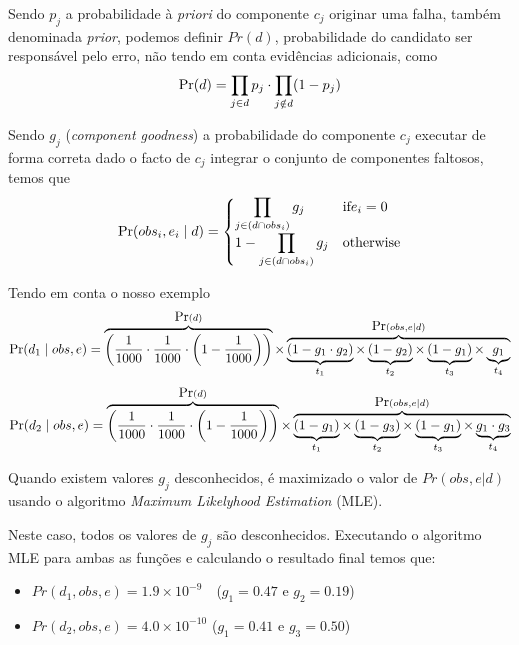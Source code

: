 Sendo $p_j$ a probabilidade à \emph{priori} do componente $c_j$ originar uma falha, também denominada \emph{prior}, podemos definir $Pr(d)$, probabilidade do candidato ser responsável pelo erro, não tendo em conta evidências adicionais, como
%
\begin{equation}
  \mbox{Pr}(d) = \prod_{j \in d} p_j \cdot \prod_{j \notin d} (1 - p_j)
\end{equation}


Sendo $g_j$ (\emph{component goodness}) a probabilidade do componente $c_j$ executar de forma correta dado o facto de $c_j$ integrar o conjunto de componentes faltosos, temos que
% 
\begin{equation}
  \mbox{Pr}(obs_i, e_i \mid  d) = 
  \begin{cases}
    \displaystyle\prod_{j \in (d \cap obs_i)} g_j 		& \textrm{if} e_i = 0 \\
	1 - \displaystyle\prod_{j \in (d \cap obs_i)} g_j  & \textrm{otherwise}
  \end{cases}
\end{equation}

Tendo em conta o nosso exemplo
%
\begin{equation}
    \mbox{Pr}(d_1 \mid obs,e) =
    \overbrace{\bigg(\frac{1}{1000} \cdot \frac{1}{1000} \cdot \bigg(1 - \frac{1}{1000}\bigg)\bigg)}^{\mbox{Pr}(d)}
    \times
    \overbrace{
      \underbrace{(1-g_1 \cdot g_2)}_{t_1}
      \times
      \underbrace{(1-g_2)}_{t_2}
      \times
      \underbrace{(1-g_1)}_{t_3}
      \times
      \underbrace{g_1}_{t_4}
    }^{\mbox{Pr}(obs,e \mid d)}
\end{equation}
%
\begin{equation}
    \mbox{Pr}(d_2 \mid obs,e) =
    \overbrace{\bigg(\frac{1}{1000} \cdot \frac{1}{1000} \cdot \bigg(1 - \frac{1}{1000}\bigg)\bigg)}^{\mbox{Pr}(d)}
    \times
    \overbrace{
      \underbrace{(1-g_1)}_{t_1}
      \times
      \underbrace{(1-g_3)}_{t_2}
      \times
      \underbrace{(1-g_1)}_{t_3}
      \times
      \underbrace{g_1 \cdot g_3}_{t_4}
    }^{\mbox{Pr}(obs,e \mid d)}
\end{equation}


Quando existem valores $g_j$ desconhecidos, é maximizado o valor de $Pr(obs, e | d)$ usando o algoritmo \emph{Maximum Likelyhood Estimation} (MLE).

Neste caso, todos os valores de $g_j$ são desconhecidos. Executando o algoritmo MLE para ambas as funções e calculando o resultado final temos que:
%
\begin{itemize}
\item $Pr(d_1, obs, e) = 1.9 \times 10^{-9}$\ \ ($g_1 = 0.47$ e $g_2 = 0.19$)
\item $Pr(d_2, obs, e) = 4.0 \times 10^{-10}$ ($g_1 = 0.41$ e $g_3 = 0.50$)
\end{itemize}


